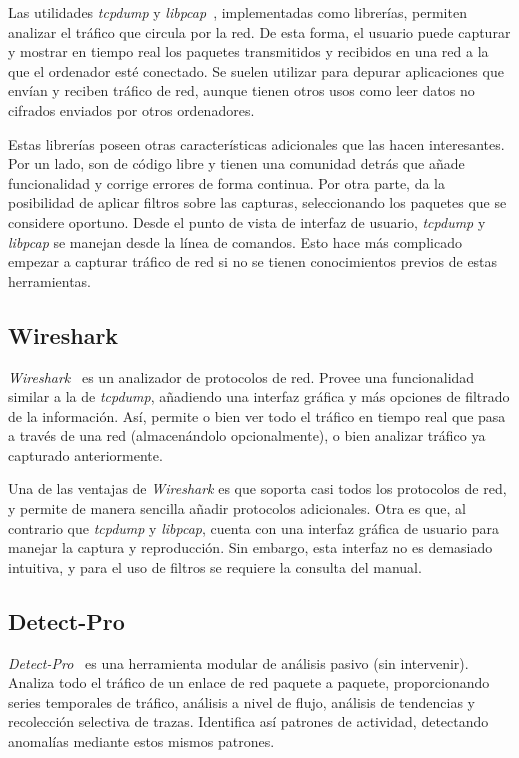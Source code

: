 Las utilidades \textit{tcpdump} y \textit{libpcap}~\cite{tcpdump}, implementadas como librerías, permiten analizar el tráfico que circula por la red.
De esta forma, el usuario puede capturar y mostrar en tiempo real los paquetes transmitidos y recibidos en una red a la que el ordenador esté conectado.
Se suelen utilizar para depurar aplicaciones que envían y reciben tráfico de red, aunque tienen otros usos como leer datos no cifrados enviados por otros ordenadores.

Estas librerías poseen otras características adicionales que las hacen interesantes.
Por un lado, son de código libre y tienen una comunidad detrás que añade funcionalidad y corrige errores de forma continua.
Por otra parte, da la posibilidad de aplicar filtros sobre las capturas, seleccionando los paquetes que se considere oportuno.
Desde el punto de vista de interfaz de usuario, \textit{tcpdump} y \textit{libpcap} se manejan desde la línea de comandos.
Esto hace más complicado empezar a capturar tráfico de red si no se tienen conocimientos previos de estas herramientas.

\subsection*{Wireshark\label{sec:eda:wireshark}}

\textit{Wireshark}~\cite{wireshark} es un analizador de protocolos de red.
Provee una funcionalidad similar a la de \textit{tcpdump}, añadiendo una interfaz gráfica y más opciones de filtrado de la información.
Así, permite o bien ver todo el tráfico en tiempo real que pasa a través de una red (almacenándolo opcionalmente), o bien analizar tráfico ya capturado anteriormente.

Una de las ventajas de \textit{Wireshark} es que soporta casi todos los protocolos de red, y permite de manera sencilla añadir protocolos adicionales.
Otra es que, al contrario que \textit{tcpdump} y \textit{libpcap}, cuenta con una interfaz gráfica de usuario para manejar la captura y reproducción.
Sin embargo, esta interfaz no es demasiado intuitiva, y para el uso de filtros se requiere la consulta del manual.

\subsection*{Detect-Pro\label{sec:eda:detectpro}}

\textit{Detect-Pro}~\cite{detectpro} es una herramienta modular de análisis pasivo (sin intervenir).
Analiza todo el tráfico de un enlace de red paquete a paquete, proporcionando series temporales de tráfico, análisis a nivel de flujo, análisis de tendencias y recolección selectiva de \glspl{traza}.
Identifica así patrones de actividad, detectando anomalías mediante estos mismos patrones.


